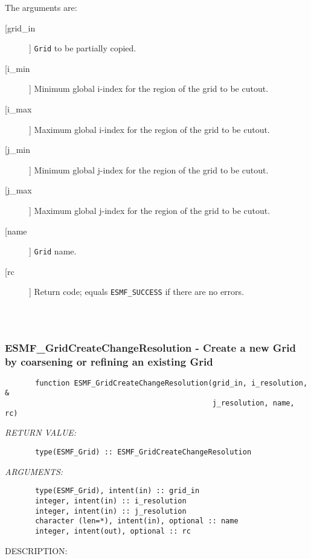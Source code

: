        The arguments are:
       \begin{description}
       \item[[grid\_in]]
            {\tt Grid} to be partially copied.
       \item[[i\_min]]
            Minimum global i-index for the region of the grid to be cutout.
       \item[[i\_max]]
            Maximum global i-index for the region of the grid to be cutout.
       \item[[j\_min]]
            Minimum global j-index for the region of the grid to be cutout.
       \item[[j\_max]]
            Maximum global j-index for the region of the grid to be cutout.
       \item[[name]]
            {\tt Grid} name.
       \item[[rc]]
            Return code; equals {\tt ESMF\_SUCCESS} if there are no errors.
     \end{description}
  
\begin{verbatim} \end{verbatim}
 
 
\mbox{}\hrulefill\ 
 
\subsubsection{ESMF\_GridCreateChangeResolution - Create a new Grid by coarsening or refining an existing Grid}


\begin{verbatim}       function ESMF_GridCreateChangeResolution(grid_in, i_resolution, &
                                                j_resolution, name, rc)\end{verbatim}{\em RETURN VALUE:}
\begin{verbatim}       type(ESMF_Grid) :: ESMF_GridCreateChangeResolution\end{verbatim}{\em ARGUMENTS:}
\begin{verbatim}       type(ESMF_Grid), intent(in) :: grid_in
       integer, intent(in) :: i_resolution
       integer, intent(in) :: j_resolution
       character (len=*), intent(in), optional :: name
       integer, intent(out), optional :: rc\end{verbatim}
{\sf DESCRIPTION:\\ }


